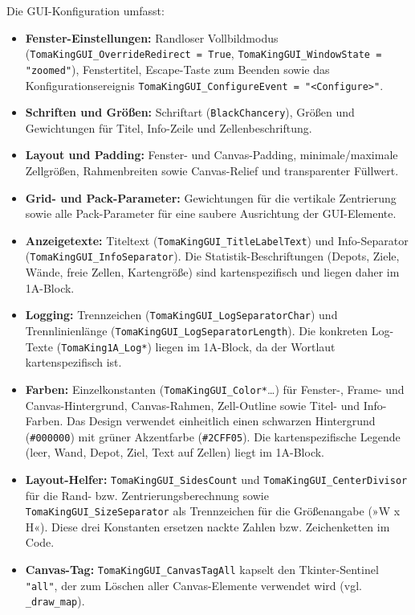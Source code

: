 Die \acs{GUI}-Konfiguration umfasst:
\begin{itemize}
    \item \textbf{Fenster-Einstellungen:} Randloser Vollbildmodus (\texttt{TomaKingGUI\_OverrideRedirect = True}, \texttt{TomaKingGUI\_WindowState = "zoomed"}), Fenstertitel, Escape-Taste zum Beenden sowie das Konfigurationsereignis \texttt{TomaKingGUI\_ConfigureEvent = "<Configure>"}.
    \item \textbf{Schriften und Größen:} Schriftart (\texttt{BlackChancery}), Größen und Gewichtungen für Titel, Info-Zeile und Zellenbeschriftung.
    \item \textbf{Layout und Padding:} Fenster- und Canvas-Padding, minimale/maximale Zellgrößen, Rahmenbreiten sowie Canvas-Relief und transparenter Füllwert.
    \item \textbf{Grid- und Pack-Parameter:} Gewichtungen für die vertikale Zentrierung sowie alle Pack-Parameter für eine saubere Ausrichtung der \acs{GUI}-Elemente.
    \item \textbf{Anzeigetexte:} Titeltext (\texttt{TomaKingGUI\_TitleLabelText}) und Info-Separator (\texttt{TomaKingGUI\_InfoSeparator}). Die Statistik-Beschriftungen (Depots, Ziele, Wände, freie Zellen, Kartengröße) sind kartenspezifisch und liegen daher im 1A-Block.
    \item \textbf{Logging:} Trennzeichen (\texttt{TomaKingGUI\_LogSeparatorChar}) und Trennlinienlänge (\texttt{TomaKingGUI\_LogSeparatorLength}). Die konkreten Log-Texte (\texttt{TomaKing1A\_Log*}) liegen im 1A-Block, da der Wortlaut kartenspezifisch ist.
    \item \textbf{Farben:} Einzelkonstanten (\texttt{TomaKingGUI\_Color*}…) für Fenster-, Frame- und Canvas-Hintergrund, Canvas-Rahmen, Zell-Outline sowie Titel- und Info-Farben. Das Design verwendet einheitlich einen schwarzen Hintergrund (\texttt{\#000000}) mit grüner Akzentfarbe (\texttt{\#2CFF05}). Die kartenspezifische Legende (leer, Wand, Depot, Ziel, Text auf Zellen) liegt im 1A-Block.
    \item \textbf{Layout-Helfer:} \texttt{TomaKingGUI\_SidesCount} und \texttt{TomaKingGUI\_CenterDivisor} für die Rand- bzw. Zentrierungsberechnung sowie \texttt{TomaKingGUI\_SizeSeparator} als Trennzeichen für die Größenangabe (»W x H«). Diese drei Konstanten ersetzen nackte Zahlen bzw. Zeichenketten im Code.
    \item \textbf{Canvas-Tag:} \texttt{TomaKingGUI\_CanvasTagAll} kapselt den Tkinter-Sentinel \texttt{"all"}, der zum Löschen aller Canvas-Elemente verwendet wird (vgl. \texttt{\_draw\_map}).
\end{itemize}

